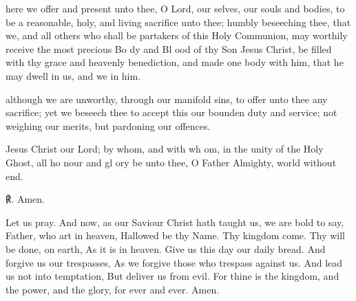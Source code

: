  here we offer and present unto thee, O Lord, our selves, our souls and bodies, to be a reasonable, holy, and living sacrifice unto thee; humbly beseeching thee, that we, and all others who shall be partakers of this Holy Communion, may worthily receive the most precious Bo {} dy and Bl {} ood of thy Son Jesus Christ, be filled with thy grace and heavenly benediction, and made one body with him, that he may dwell in us, and we in him.
\par
{}
 although we are unworthy, through our manifold sins, to offer unto thee any sacrifice; yet we beseech thee to accept this our bounden duty and service; not weighing our merits, but pardoning our offences.
\par
{}
 Jesus Christ our Lord; by {} whom, and with wh {} om, in the unity of the Holy {} Ghost, all ho {} nour and gl {} ory be unto thee, O Father Almighty, world without end.\par
℟. Amen.
\vspace{-1ex}
\par\noindent
Let us pray. And now, as our Saviour Christ hath taught us, we are bold to say,
 Father, who art in heaven, Hallowed be thy Name. Thy kingdom come. Thy will be done, on earth, As it is in heaven. Give us this day our daily bread. And forgive us our trespasses, As we forgive those who trespass against us. And lead us not into temptation, But deliver us from evil. For thine is the kingdom, and the power, and the glory, for ever and ever. Amen.
